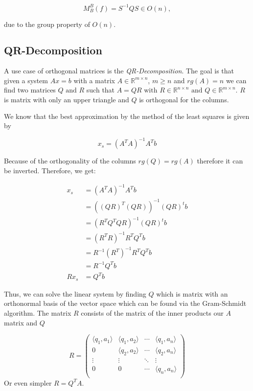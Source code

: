\[
M_B^B(f) = S^{-1} Q S \in O(n),
\]

due to the group property of \( O(n) \).

\QED

\subsection{QR-Decomposition}

A use case of orthogonal matrices is the \emph{QR-Decomposition}. The goal is that given a system \( Ax = b\) 
with a matrix \(A\in \mathbb{R}^{m \times n}\), \(m \ge n\) and \(rg(A) = n\) we can find two matrices \(Q \text{ and } R\) 
such that \(A = QR \text{ with } R\in \mathbb{R}^{n \times n} \text{ and } Q \in \mathbb{R}^{m \times n}\).
\(R\) is matrix with only an upper triangle and \(Q\) is orthogonal for the columns.
\vspace{\baselineskip}

We know that the best approximation by the method of the least squares is given by

\[
x_s = (A^T A)^{-1} A^T b
\]

Because of the orthogonality of the columns \(rg(Q) = rg(A)\) therefore it can be inverted. Therefore,
we get:

\begin{align*}
    x_s &= (A^T A)^{-1} A^T b \\
        &= ((QR)^T (QR))^{-1} (QR)^t b \\
        &= (R^T Q^T QR)^{-1} (QR)^t b \\
        &= (R^T R)^{-1} R^T Q^T b \\
        &=  R^{-1} (R^T)^{-1} R^T Q^T b \\
        &=  R^{-1} Q^T b \\
    Rx_s&= Q^T b
\end{align*}

Thus, we can solve the linear system by finding \(Q\) which is matrix with an orthonormal basis of the 
vector space which can be found via the Gram-Schmidt algorithm. The matrix \(R\) consists of the matrix of the 
inner products our \(A\) matrix and \(Q\)

\[
R =
\begin{pmatrix}
    \langle q_1, a_1 \rangle & \langle q_1, a_2 \rangle & \cdots &\langle q_1, a_n\rangle \\ 
    0 & \langle q_2, a_2 \rangle & \cdots & \langle q_2, a_n\rangle \\ 
    \vdots & \vdots  & \ddots & \vdots \\
    0 & 0  & \cdots & \langle q_n, a_n \rangle \\ 
\end{pmatrix}
\]
Or even simpler \(R = Q^T A\).
\vspace{\baselineskip}


